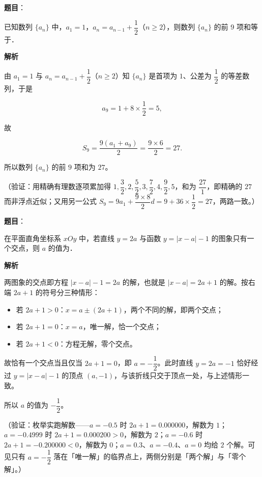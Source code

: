 \begin{answer}

\textbf{题目}：

已知数列 \(\{a_n\}\) 中，\(a_1=1\)，\(a_n=a_{n-1}+\dfrac{1}{2}\)（\(n\geqslant 2\)），则数列 \(\{a_n\}\) 的前 9 项和等于\gkblank{}．

\textbf{解析}

由 \(a_1=1\) 与 \(a_n=a_{n-1}+\dfrac{1}{2}\)（\(n\geqslant 2\)）知 \(\{a_n\}\) 是首项为 \(1\)、公差为 \(\dfrac{1}{2}\) 的等差数列，于是

\nopagebreak[4]
\[
a_9=1+8\times\dfrac{1}{2}=5,
\]

故

\nopagebreak[4]
\[
S_9=\dfrac{9(a_1+a_9)}{2}=\dfrac{9\times 6}{2}=27.
\]

所以数列 \(\{a_n\}\) 的前 \(9\) 项和为 \(27\)。

（验证：用精确有理数逐项累加得 \(1,\dfrac{3}{2},2,\dfrac{5}{2},3,\dfrac{7}{2},4,\dfrac{9}{2},5\)，和为 \(\dfrac{27}{1}\)，即精确的 \(27\) 而非浮点近似；又用另一公式 \(S_9=9a_1+\dfrac{9\times 8}{2}d=9+36\times\dfrac{1}{2}=27\)，两路一致。）


\end{answer}
\begin{answer}

\textbf{题目}：

在平面直角坐标系 \(xOy\) 中，若直线 \(y=2a\) 与函数 \(y=|x-a|-1\) 的图象只有一个交点，则 \(a\) 的值为\gkblank{}．

\textbf{解析}

两图象的交点即方程 \(|x-a|-1=2a\) 的解，也就是 \(|x-a|=2a+1\) 的解。按右端 \(2a+1\) 的符号分三种情形：

\begin{itemize}
\item 若 \(2a+1>0\)：\(x=a\pm(2a+1)\)，两个不同的解，即两个交点；
\item 若 \(2a+1=0\)：\(x=a\)，唯一解，恰一个交点；
\item 若 \(2a+1<0\)：方程无解，零个交点。
\end{itemize}

故恰有一个交点当且仅当 \(2a+1=0\)，即 \(a=-\dfrac{1}{2}\)。此时直线 \(y=2a=-1\) 恰好经过 \(y=|x-a|-1\) 的顶点 \((a,-1)\)，与该折线只交于顶点一处，与上述情形一致。

所以 \(a\) 的值为 \(-\dfrac{1}{2}\)。

（验证：枚举实跑解数——\(a=-0.5\) 时 \(2a+1=0.000000\)，解数为 \(1\)；\(a=-0.4999\) 时 \(2a+1=0.000200>0\)，解数为 \(2\)；\(a=-0.6\) 时 \(2a+1=-0.200000<0\)，解数为 \(0\)；\(a=0.3\)、\(a=-0.4\)、\(a=0\) 均给 \(2\) 个解。可见只有 \(a=-\dfrac{1}{2}\) 落在「唯一解」的临界点上，两侧分别是「两个解」与「零个解」。）


\end{answer}
